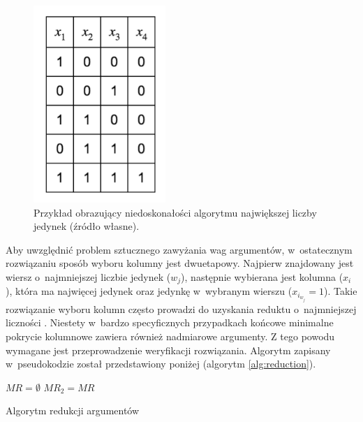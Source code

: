 \begin{figure}[H]
\centering
\includegraphics[width = 5cm]{chapter02/required-arguments.png}
\caption{Przykład obrazujący niedoskonałości algorytmu największej liczby jedynek (źródło własne).}
\label{fig:required-arguments}
\end{figure}

Aby uwzględnić problem sztucznego zawyżania wag argumentów,
w~ostatecznym rozwiązaniu sposób wyboru kolumny jest dwuetapowy.
Najpierw znajdowany jest wiersz o~najmniejszej liczbie jedynek ($w_j$),
następnie wybierana jest kolumna ($x_i$),
która ma najwięcej jedynek oraz jedynkę w~wybranym wierszu ($x_{i_{w_j}} = 1$).
Takie rozwiązanie wyboru kolumn często prowadzi do uzyskania reduktu o~najmniejszej liczności \cite{unate-artykul}.
Niestety w~bardzo specyficznych przypadkach końcowe minimalne pokrycie kolumnowe zawiera również nadmiarowe argumenty.
Z tego powodu wymagane jest przeprowadzenie weryfikacji rozwiązania.
Algorytm zapisany w~pseudokodzie został przedstawiony poniżej (algorytm \ref{alg:reduction}).

\begin{algorithm}[h]
    $MR=\emptyset$\;
    $MR_2 = MR$\;
    \caption{Algorytm redukcji argumentów}
    \label{alg:reduction}
\end{algorithm}

